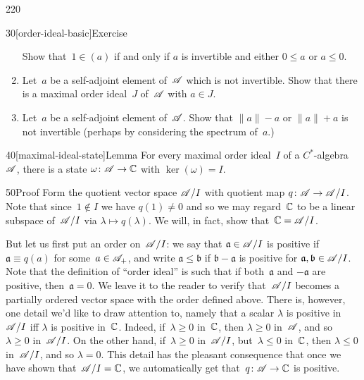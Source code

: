\begin{parsec}{220}
\begin{point}{30}[order-ideal-basic]{Exercise}
\begin{enumerate}
Show that~$1\in (a)$ if and only if $a$ is invertible
and either $0\leq a$ or $a\leq 0$.

\item
Let~$a$ be a self-adjoint element of~$\mathscr{A}$ which
is not invertible.
Show that there is a maximal order ideal~$J$
of~$\mathscr{A}$
with $a\in J$.

\item
Let~$a$ be a self-adjoint element of~$\mathscr{A}$.
Show that  $\|a\|-a$
or $\|a\|+a$ is not invertible
(perhaps by considering the spectrum of~$a$.)
\end{enumerate}%
\spacingfix{}%
\end{point}%
\begin{point}{40}[maximal-ideal-state]{Lemma}%
For every maximal order ideal~$I$ of a $C^*$-algebra~$\mathscr{A}$,
 there is a state $\omega \colon \mathscr{A}\to \mathbb{C}$
with $\ker(\omega)=I$.
\begin{point}{50}{Proof}%
Form the quotient vector space $\mathscr{A}/I$
with quotient map $q\colon \mathscr{A}\to \mathscr{A}/I$.
Note that since~$1\notin I$
we have $q(1)\neq 0$
and so we may regard~$\mathbb{C}$ 
to be a linear subspace of~$\mathscr{A}/I$
via $\lambda\mapsto q(\lambda)$.
We will, in fact, show that~$\mathbb{C}=\mathscr{A}/I$.

But let us first put an order on~$\mathscr{A}/I$:
we say that $\mathfrak{a}\in \mathscr{A}/I$ is positive
if $\mathfrak{a}\equiv q(a)$ for some~$a\in\mathscr{A}_{+}$,
and write $\mathfrak{a}\leq \mathfrak{b}$ 
if $\mathfrak{b}-\mathfrak{a}$ is positive
for $\mathfrak{a},\mathfrak{b}\in\mathscr{A}/I$.
Note that the definition of ``order ideal'' is such
that if both~$\mathfrak{a}$ and $-\mathfrak{a}$ are positive,
then~$\mathfrak{a}=0$.
We leave it to the reader to verify 
that~$\mathscr{A}/I$ becomes a partially ordered vector space
with the order defined above.
There is, however,
one detail we'd like to draw attention to,
namely that a scalar $\lambda$ is positive in~$\mathscr{A}/I$
iff $\lambda$ is positive in~$\mathbb{C}$.
Indeed, if~$\lambda\geq 0$ in~$\mathbb{C}$,
then $\lambda\geq 0$ in~$\mathscr{A}$, and so~$\lambda \geq 0$ in~$\mathscr{A}/I$.
On the other hand,
if~$\lambda\geq 0$ in~$\mathscr{A}/I$, but~$\lambda\leq 0$ in~$\mathbb{C}$,
then $\lambda\leq 0$ in~$\mathscr{A}/I$,
and so $\lambda=0$.
This detail
has the pleasant consequence
that once we have shown that~$\mathscr{A}/I=\mathbb{C}$,
we automatically get that~$q\colon \mathscr{A}\to\mathbb{C}$ is positive.


\end{point}
\end{point}
\end{parsec}
